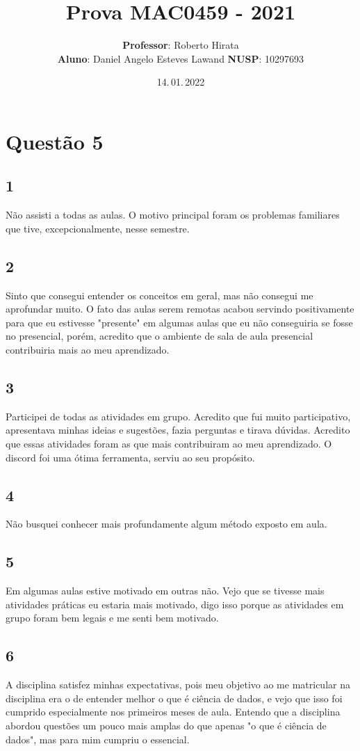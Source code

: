 \documentclass[
	10pt,
	parskip=half-,		
	paper=a4,			
	english, portuguese		
	]{scrartcl}
\title{Prova MAC0459 - 2021}
\author{\textbf{Professor}: Roberto Hirata\\%
        \textbf{Aluno}: Daniel Angelo Esteves Lawand \textbf{NUSP}: 10297693}
\date{14.\,01.\,2022}
\begin{document}
\maketitle			
\section{Questão 5}
    \subsection*{1}
    Não assisti a todas as aulas. O motivo principal foram os problemas familiares que tive, excepcionalmente, nesse semestre.
    \subsection*{2}
    Sinto que consegui entender os conceitos em geral, mas não consegui me aprofundar muito. O fato das aulas serem remotas acabou servindo positivamente para que eu estivesse "presente" em algumas aulas que eu não conseguiria se fosse no presencial, porém, acredito que o ambiente de sala de aula presencial contribuiria mais ao meu aprendizado.
    \subsection*{3}
    Participei de todas as atividades em grupo. Acredito que fui muito participativo, apresentava minhas ideias e sugestões, fazia perguntas e tirava dúvidas. Acredito que essas atividades foram as que mais contribuiram ao meu aprendizado. O discord foi uma ótima ferramenta, serviu ao seu propósito.
    \subsection*{4}
    Não busquei conhecer mais profundamente algum método exposto em aula. 
    \subsection*{5}
    Em algumas aulas estive motivado em outras não. Vejo que se tivesse mais atividades práticas eu estaria mais motivado, digo isso porque as atividades em grupo foram bem legais e me senti bem motivado.
    \subsection*{6}
    A disciplina satisfez minhas expectativas, pois meu objetivo ao me matricular na disciplina era o de entender melhor o que é ciência de dados, e vejo que isso foi cumprido especialmente nos primeiros meses de aula. Entendo que a disciplina abordou questões um pouco mais amplas do que apenas "o que é ciência de dados", mas para mim cumpriu o essencial.
\end{document}
